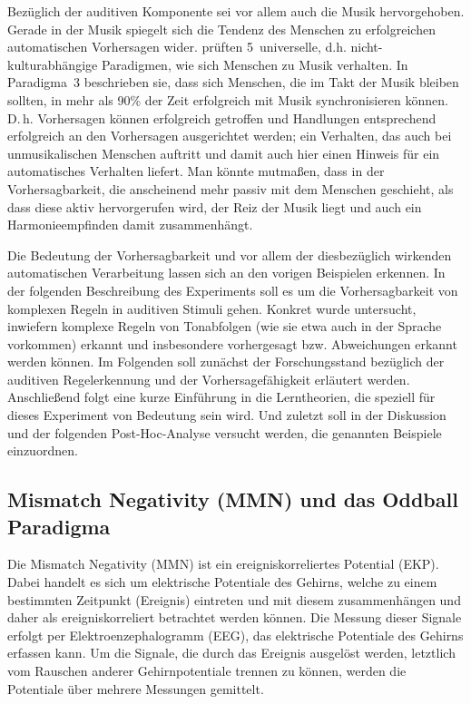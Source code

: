 \documentclass[doc,a4paper,12pt]{apa6}
\begin{document}
Bezüglich der auditiven Komponente sei vor allem auch die Musik hervorgehoben. Gerade in der Musik spiegelt sich die Tendenz des Menschen zu erfolgreichen automatischen Vorhersagen wider. \textcite{drake2001quest} prüften 5~universelle, d.h. nicht-kulturabhängige Paradigmen, wie sich Menschen zu Musik verhalten. In Paradigma~3 beschrieben sie, dass sich Menschen, die im Takt der Musik bleiben sollten, in mehr als 90\% der Zeit erfolgreich mit Musik synchronisieren können. D.\,h. Vorhersagen können erfolgreich getroffen und Handlungen entsprechend erfolgreich an den Vorhersagen ausgerichtet werden; ein Verhalten, das auch bei unmusikalischen Menschen auftritt und damit auch hier einen Hinweis für ein automatisches Verhalten liefert. Man könnte mutmaßen, dass in der Vorhersagbarkeit, die anscheinend mehr passiv mit dem Menschen geschieht, als dass diese aktiv hervorgerufen wird, der Reiz der Musik liegt und auch ein Harmonieempfinden damit zusammenhängt.

Die Bedeutung der Vorhersagbarkeit und vor allem der diesbezüglich wirkenden automatischen Verarbeitung lassen sich an den vorigen Beispielen erkennen. In der folgenden Beschreibung des Experiments soll es um die Vorhersagbarkeit von komplexen Regeln in auditiven Stimuli gehen. Konkret wurde untersucht, inwiefern komplexe Regeln von Tonabfolgen (wie sie etwa auch in der Sprache vorkommen) erkannt und insbesondere vorhergesagt bzw. Abweichungen erkannt werden können. Im Folgenden soll zunächst der Forschungsstand bezüglich der auditiven Regelerkennung und der Vorhersagefähigkeit erläutert werden. Anschließend folgt eine kurze Einführung in die Lerntheorien, die speziell für dieses Experiment von Bedeutung sein wird. Und zuletzt soll in der Diskussion und der folgenden Post-Hoc-Analyse versucht werden, die genannten Beispiele einzuordnen.

\subsection{Mismatch Negativity (MMN) und das Oddball Paradigma}

Die Mismatch Negativity (MMN) ist ein ereigniskorreliertes Potential (EKP). Dabei handelt es sich um elektrische Potentiale des Gehirns, welche zu einem bestimmten Zeitpunkt (Ereignis) eintreten und mit diesem zusammenhängen und daher als ereigniskorreliert betrachtet werden können. Die Messung dieser Signale erfolgt per Elektroenzephalogramm (EEG), das elektrische Potentiale des Gehirns erfassen kann. Um die Signale, die durch das Ereignis ausgelöst werden, letztlich vom Rauschen anderer Gehirnpotentiale trennen zu können, werden die Potentiale über mehrere Messungen gemittelt.
\end{document}
